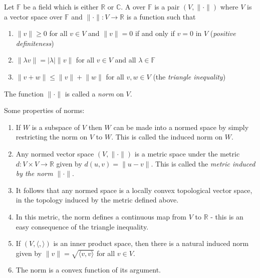 \documentclass{article}
\theoremstyle{remark}
\newcommand{\norm}[1]{\lVert #1 \rVert}
\newcommand{\abs}[1]{\lvert #1 \rvert}
\newcommand{\ip}[2]{\langle #1 , #2 \rangle}
\begin{document}
Let $\mathbb{F}$ be a field which is either $\mathbb{R}$ or $\mathbb{C}$.  A \emph{} over $\mathbb{F}$ is a pair $(V,\norm{\cdot})$ where $V$ is a vector space over $\mathbb{F}$ and $\norm{\cdot}\colon V\to\mathbb{R}$ is a function such that
\begin{enumerate}
\item $\norm{v}\geq 0$ for all $v\in V$ and $\norm{v}=0$ if and only if $v=0$ in $V$ (\emph{positive definiteness})
\item $\norm{\lambda v} = \abs{\lambda}\norm{v}$ for all $v\in V$ and all $\lambda\in\mathbb{F}$
\item $\norm{v+w}\leq\norm{v}+\norm{w}$ for all $v,w\in V$ (the \emph{triangle inequality})
\end{enumerate}

The function $\norm{\cdot}$ is called a \emph{norm} on $V$.

Some properties of norms:

\begin{enumerate}
\item
If $W$ is a subspace of $V$ then $W$ can be made into a normed space by simply restricting the norm on $V$ to $W$.  This is called the induced norm on $W$.

\item
Any normed vector space $(V,\norm{\cdot})$ is a metric space under the metric $d\colon V \times V \to \mathbb{R}$ given by $d(u,v)=\norm{u-v}$.  This is called the \emph{metric induced by the norm $\norm{\cdot}$}.

\item
It follows that any normed space is a locally convex topological vector space, in the topology induced by the metric defined above.

\item
In this metric, the norm defines a continuous map from $V$ to $\mathbb{R}$ - this is an easy consequence of the triangle inequality.

\item
If $(V, \ip{}{})$ is an inner product space, then there is a natural induced norm given by $\norm{v} = \sqrt{\ip{v}{v}}$ for all $v \in V$.

\item
The norm is a convex function of its argument.
\end{enumerate}
\end{document}
